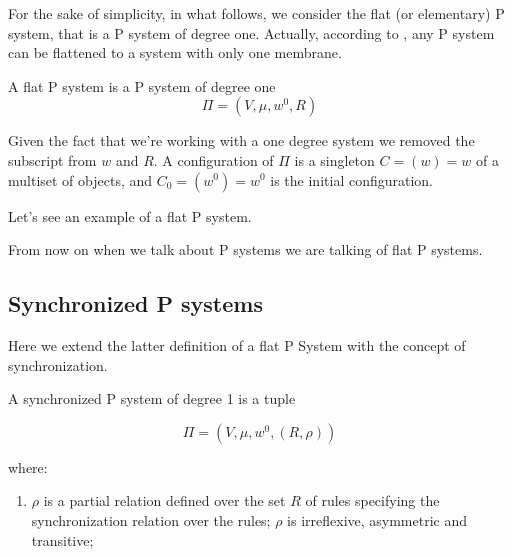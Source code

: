 For the sake of simplicity, in what follows, we consider the flat (or elementary) P system, that is a P system of degree one.
Actually, according to \cite{agrigoroaiei2010flattening}, any P system can be flattened to a system with only one membrane.

\begin{definition}
A flat P system is a P system of degree one
\[ \Pi = (V,\mu,w^0,R) \]

Given the fact that we're working with a one degree system we removed the subscript from $w$ and $R$. 
A configuration of $\Pi$ is a singleton $C=(w)=w$ of a multiset of objects, and 
$C_0=(w^0)=w^0$ is the initial configuration.
\end{definition}

Let's see an example of a flat P system.

\begin{figure}[h]
\centering


\caption{}
\label{}
\end{figure}

From now on when we talk about P systems we are talking of flat P systems.

\subsection{Synchronized P systems}

Here we extend the latter definition of a flat P System with the concept of synchronization. 

\begin{definition}
A synchronized P system of degree 1 is a tuple

\[ \Pi = (V,\mu,w^0,(R,\rho)) \]

where:
\begin{enumerate}
  \item $\rho$ is a partial relation defined over the set $R$ of rules specifying
  the synchronization relation over the rules;
  $\rho$ is irreflexive, asymmetric and transitive;
\end{enumerate}
\end{definition}

